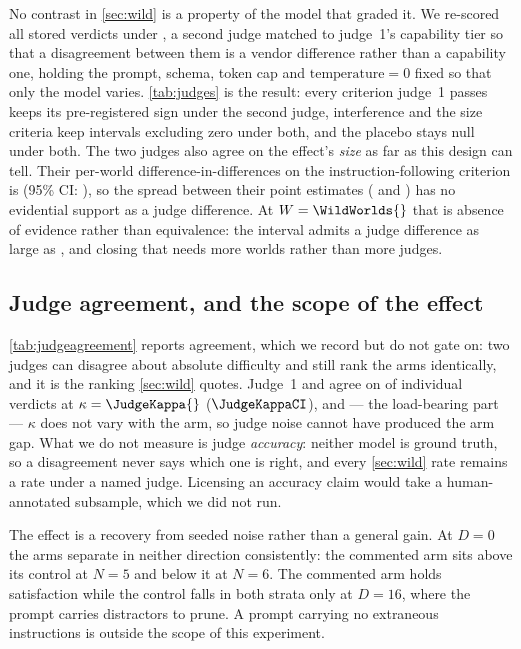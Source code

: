 No contrast in \autoref{sec:wild} is a property of the model that graded it. We re-scored all
\JudgeVerdicts{} stored verdicts under \JudgeAlt{}, a second judge matched to judge~1's capability
tier so that a disagreement between them is a vendor difference rather than a capability one,
holding the prompt, schema, token cap and $\text{temperature}{=}0$ fixed so that only the model
varies. \autoref{tab:judges} is the result: every criterion judge~1 passes keeps its pre-registered
sign under the second judge, interference and the size criteria keep intervals excluding zero under
both, and the placebo stays null under both. The two judges also agree on the effect's \emph{size}
as far as this design can tell. Their per-world difference-in-differences on the
instruction-following criterion is \JudgeDidPp{} (95\% CI: \JudgeDidCI{}), so the spread
between their point estimates (\WildDeltaSatPp{} and \JudgeAltDeltaSatPp{}) has no
evidential support as a judge difference. At $W = \WildWorlds{}$ that is absence of evidence rather
than equivalence: the interval admits a judge difference as large as \JudgeDidBound{}, and
closing that needs more worlds rather than more judges.

\subsection{Judge agreement, and the scope of the effect}
\label{sec:appendix:judgeagreement}

\autoref{tab:judgeagreement} reports agreement, which we record but do not gate on: two judges can
disagree about absolute difficulty and still rank the arms identically, and it is the ranking
\autoref{sec:wild} quotes. Judge~1 and \JudgeAlt{} agree on \JudgeAgreePct{} of individual
verdicts at $\kappa = \JudgeKappa{}$ ($\JudgeKappaCI$), and --- the load-bearing part --- $\kappa$
does not vary with the arm, so judge noise cannot have produced the arm gap. What we do not measure
is judge \emph{accuracy}: neither model is ground truth, so a disagreement never says which one is
right, and every \autoref{sec:wild} rate remains a rate under a named judge. Licensing an accuracy
claim would take a human-annotated subsample, which we did not run.

The effect is a recovery from seeded noise rather than a general gain. At $D = 0$ the arms separate
in neither direction consistently: the commented arm sits above its control at $N = 5$ and below
it at $N = 6$. The commented arm holds satisfaction while the control falls in both strata only at
$D = 16$, where the prompt carries distractors to prune. A prompt carrying no extraneous
instructions is outside the scope of this experiment.

